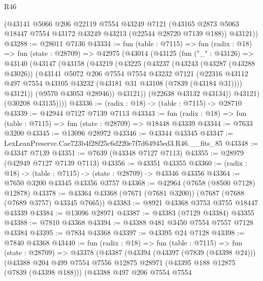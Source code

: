 \begin{lexlean}{R46}
\begin{coremodule}
      (@43141
        @5066
        @206
        @22119
        @7554
        @43249
        @7121
        (@43165 @2873 @5063 @18447 @7554 @43172 @43249 @43213 (@22544 @28720 @7139 @188))
        @43121))
@43288 := @28011 @7136
@43334 := fun (table : @7115) =>
  fun (radix : @18) =>
  fun (state : @28709) =>
  @42975
    (@43014
      (@43125
        (fun ("_" : @43126) =>
        @43140
          (@43147
            (@43158
              (@43219
                (@43225
                  (@43237
                    (@43243
                      (@43287 (@43288 @43026))
                      (@43141
                        @5072
                        @206
                        @7554
                        @7554
                        @43232
                        @7121
                        (@22316
                          @43112
                          @497
                          @7554
                          @43105
                          @43232
                          (@43181 @31 @43108 (@7839 (@43184 @31))))
                        @43121))
                    (@9570 @43053 @28946))
                  @43121))
              (@22638 @43132 @43134))
            @43121)
          (@30208 @43135))))
@43336 := (radix : @18) -> (table : @7115) -> @28710
@43339 := @42944 @7127 @7139 @7113
@43343 := fun (radix : @18) => fun (table : @7115) => fun (state : @28709) => @18448 @43339
@43344 := @7633 @3200
@43345 := @13096 @28972
@43346 := @43344 @43345
@43347 := LexLeanPreserve.Cae723b4f28f25c6d220e7f7d64945ed3.R46.__fits_85
@43348 := @43347 @7139
@43351 := @7639 (@43348 @7127 @7113)
@43355 := @28979 (@42949 @7127 @7139 @7113)
@43356 := @43351 @43355
@43360 := (radix : @18) -> (table : @7115) -> (state : @28709) -> @43346 @43356
@43364 := @7650 @3200 @43345 @43356 @3757
@43368 := @42964 (@7658 (@8500 @7128) @12878)
@43378 := @43364 @43368 (@7671 (@7681 @3200)) (@7687 (@7688 (@7689 @3757) @43345 @7665))
@43383 := @8921 @43368 @3753 @3755 @18447 @43339
@43384 := @13096 @28971
@43387 := @43383 (@7129 @43384) @43355
@43388 := @7810 @43368
@43394 := @43388 @481 @3450 @7554 @7557 @7128 @43384
@43395 := @7834 @43368
@43397 := @43395 @24 @7128
@43398 := @7840 @43368
@43440 := fun (radix : @18) =>
  fun (table : @7115) =>
  fun (state : @28709) =>
  @43378
    (@43387
      (@43394
        (@43397 (@7839 (@43398 @24)))
        (@43388
          @204
          @499
          @7554
          @7556
          @12875
          @28971
          (@43395 @188 @12875 (@7839 (@43398 @188)))
          (@43388
            @497
            @206
            @7554
            @7554

\end{coremodule}
\end{lexlean}
